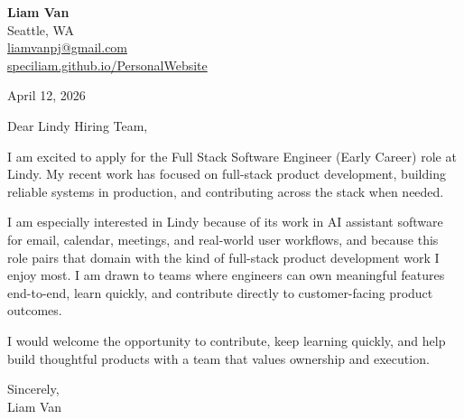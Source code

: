 \documentclass[letterpaper,11pt]{article}
\begin{document}
\begin{flushleft}
\textbf{\Large Liam Van} \\
Seattle, WA \\
\href{mailto:liamvanpj@gmail.com}{liamvanpj@gmail.com} \\
\href{https://speciliam.github.io/PersonalWebsite}{speciliam.github.io/PersonalWebsite}
\end{flushleft}

April 12, 2026

\noindent Dear Lindy Hiring Team,

\noindent I am excited to apply for the Full Stack Software Engineer (Early Career) role at Lindy. My recent work has focused on full-stack product development, building reliable systems in production, and contributing across the stack when needed.

\noindent I am especially interested in Lindy because of its work in AI assistant software for email, calendar, meetings, and real-world user workflows, and because this role pairs that domain with the kind of full-stack product development work I enjoy most. I am drawn to teams where engineers can own meaningful features end-to-end, learn quickly, and contribute directly to customer-facing product outcomes.

\noindent I would welcome the opportunity to contribute, keep learning quickly, and help build thoughtful products with a team that values ownership and execution.

\noindent Sincerely, \\
Liam Van
\end{document}
